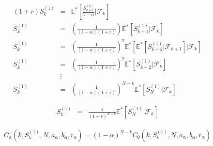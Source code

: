 \documentclass[12pt]{article}
\newenvironment{solution}[2][Solution]{\begin{trivlist}
\item[\hskip \labelsep {\bfseries #1}\hskip \labelsep {\bfseries #2.}]}{\end{trivlist}}
\newenvironment{question}[2][Question]{\begin{trivlist}
\item[\hskip \labelsep {\bfseries #1}\hskip \labelsep {\bfseries #2.}]}{\end{trivlist}}
\begin{document}
\begin{question}{7}
\end{question}
\begin{solution}[Solution]\\ 
\begin{eqnarray*}
(1+r) S_k^{(1)} &=& \mathbb{E}^* \left[\frac{S_{k+1}^{(1)}}{1-\alpha} \bigg| \mathcal{F}_k \right] \\
S_k^{(1)} &=& \left( \frac{1}{(1-\alpha)(1+r)} \right) \mathbb{E}^* \left[S_{k+1}^{(1)} \bigg| \mathcal{F}_k \right] \\
S_k^{(1)} &=& \left( \frac{1}{(1-\alpha)(1+r)} \right)^2 \mathbb{E}^* \left[ \mathbb{E}^* [S_{k+2}^{(1)} | \mathcal{F}_{k+1} ] \bigg| \mathcal{F}_k \right] \\
S_k^{(1)} &=& \left( \frac{1}{(1-\alpha)(1+r)} \right)^2 \mathbb{E}^* \left[ S_{k+2}^{(1)} \bigg| \mathcal{F}_k \right] \\
&\vdots& \\
S_k^{(1)} &=& \left( \frac{1}{(1-\alpha)(1+r)} \right)^{N-k} \mathbb{E}^* \left[ S_{N}^{(1)} \bigg| \mathcal{F}_k \right]
\end{eqnarray*}

\begin{eqnarray*}
S_k^{(1)} &=& \frac{1}{(1+r)^{N-k}} \mathbb{E}^* \left[ S_{N}^{(1)} \bigg| \mathcal{F}_k \right]
\end{eqnarray*}

\begin{eqnarray*}
C_{\alpha}(k,S_k^{(1)},N,a_{\alpha},b_{\alpha},r_{\alpha}) = (1-\alpha)^{N-k} C_0(k,S_k^{(1)},N,a_{\alpha},b_{\alpha},r_{\alpha})
\end{eqnarray*}
\end{solution}
\end{document}
